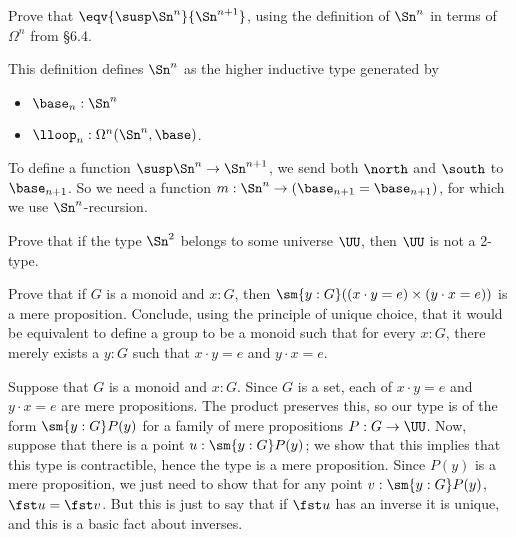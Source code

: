 Prove that $\eqv{\susp\Sn^{n}}{\Sn^{n+1}}$, using the definition of $\Sn^{n}$
in terms of $\Omega^{n}$ from \S6.4.


 \soln
This definition defines $\Sn^{n}$ as the higher inductive type generated by



\begin{itemize}
\item  $\base_{n} : \Sn^{n}$

\item  $\lloop_{n} : \Omega^{n}(\Sn^{n}, \base)$.

\end{itemize}
To define a function $\susp\Sn^{n} \to \Sn^{n+1}$, we send both $\north$ and
$\south$ to $\base_{n+1}$.  So we need a function $m : \Sn^{n} \to (\base_{n+1}
= \base_{n+1})$, for which we use $\Sn^{n}$-recursion.


Prove that if the type $\Sn^{2}$ belongs to some universe $\UU$, then $\UU$ is
not a 2-type.


Prove that if $G$ is a monoid and $x : G$, then $\sm{y:G}((x \cdot y = e)
\times (y \cdot x = e))$ is a mere proposition.  Conclude, using the principle
of unique choice, that it would be equivalent to define a group to be a monoid
such that for every $x : G$, there merely exists a $y : G$ such that $x \cdot y
= e$ and $y \cdot x = e$.


 \soln
Suppose that $G$ is a monoid and $x : G$.  Since $G$ is a set, each of $x
\cdot y = e$ and $y \cdot x = e$ are mere propositions.  The product preserves
this, so our type is of the form $\sm{y : G} P(y)$ for a family of mere
propositions $P : G \to \UU$.  Now, suppose that there is a point $u : \sm{y :
G} P(y)$; we show that this implies that this type is contractible, hence the
type is a mere proposition.  Since $P(y)$ is a mere proposition, we just need
to show that for any point $v : \sm{y : G} P(y)$, $\fst u = \fst v$.  But this
is just to say that if $\fst u$ has an inverse it is unique, and this is a
basic fact about inverses.


